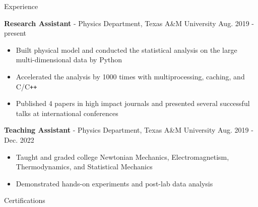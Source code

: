 \documentclass{resume}
\begin{document}
\begin{rSection}{Experience}
    \item \textbf{Research Assistant} - Physics Department, Texas A\&M University \hfill Aug. 2019 - present
        \begin{itemize}
        \item Built physical model and conducted the statistical analysis on the large multi-dimensional data by Python
        \item Accelerated the analysis by 1000 times with multiprocessing, caching, and C/C\texttt{++}
        \item Published 4 papers in high impact journals and presented several successful talks at international conferences
        \end{itemize}

    \item \textbf{Teaching Assistant} - Physics Department, Texas A\&M University \hfill Aug. 2019 - Dec. 2022
        \begin{itemize}
        \item Taught and graded college Newtonian Mechanics, Electromagnetism, Thermodynamics, and Statistical Mechanics
        \item Demonstrated hands-on experiments and post-lab data analysis
        \end{itemize}
\end{rSection}

\vspace{-0.25em}
\begin{rSection}{Certifications}
    \vspace{-1.2em}
    \item \href{https://www.coursera.org/account/accomplishments/verify/N4T4JR8XLU3Z}{\color{black}{~~~-~~Machine Learning Foundations: Algorithmic Foundations}} \vspace{-0.5em}
    \item \href{https://www.coursera.org/account/accomplishments/verify/4X4TD24NFAY4}{\color{black}{~~~-~~Machine Learning Foundations: Mathematical Foundations}} \vspace{-0.5em}
    \item \href{https://www.coursera.org/account/accomplishments/verify/TJKKSPN42ZEE}{\color{black}{~~~-~~Machine Learning Techniques}} \vspace{-0.5em}
    \item \href{https://www.coursera.org/account/accomplishments/verify/KHCRSS4J4TZE}{\color{black}{~~~-~~Divide and Conquer, Sorting and Searching, and Randomized Algorithms}} \vspace{-0.5em}
    \item \href{https://www.coursera.org/account/accomplishments/verify/5B7WBDL9BHVF}{\color{black}{~~~-~~A Crash Course in Causality: Inferring Causal Effects from Observational Data}}  \vspace{-0.5em}
\end{rSection}
\end{document}
